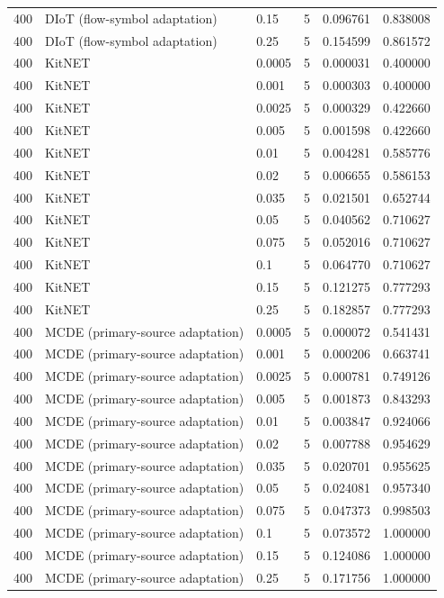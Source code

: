 \begin{tabular}{llllll}
400 & DIoT (flow-symbol adaptation) & 0.15 & 5 & 0.096761 & 0.838008 \\
400 & DIoT (flow-symbol adaptation) & 0.25 & 5 & 0.154599 & 0.861572 \\
400 & KitNET & 0.0005 & 5 & 0.000031 & 0.400000 \\
400 & KitNET & 0.001 & 5 & 0.000303 & 0.400000 \\
400 & KitNET & 0.0025 & 5 & 0.000329 & 0.422660 \\
400 & KitNET & 0.005 & 5 & 0.001598 & 0.422660 \\
400 & KitNET & 0.01 & 5 & 0.004281 & 0.585776 \\
400 & KitNET & 0.02 & 5 & 0.006655 & 0.586153 \\
400 & KitNET & 0.035 & 5 & 0.021501 & 0.652744 \\
400 & KitNET & 0.05 & 5 & 0.040562 & 0.710627 \\
400 & KitNET & 0.075 & 5 & 0.052016 & 0.710627 \\
400 & KitNET & 0.1 & 5 & 0.064770 & 0.710627 \\
400 & KitNET & 0.15 & 5 & 0.121275 & 0.777293 \\
400 & KitNET & 0.25 & 5 & 0.182857 & 0.777293 \\
400 & MCDE (primary-source adaptation) & 0.0005 & 5 & 0.000072 & 0.541431 \\
400 & MCDE (primary-source adaptation) & 0.001 & 5 & 0.000206 & 0.663741 \\
400 & MCDE (primary-source adaptation) & 0.0025 & 5 & 0.000781 & 0.749126 \\
400 & MCDE (primary-source adaptation) & 0.005 & 5 & 0.001873 & 0.843293 \\
400 & MCDE (primary-source adaptation) & 0.01 & 5 & 0.003847 & 0.924066 \\
400 & MCDE (primary-source adaptation) & 0.02 & 5 & 0.007788 & 0.954629 \\
400 & MCDE (primary-source adaptation) & 0.035 & 5 & 0.020701 & 0.955625 \\
400 & MCDE (primary-source adaptation) & 0.05 & 5 & 0.024081 & 0.957340 \\
400 & MCDE (primary-source adaptation) & 0.075 & 5 & 0.047373 & 0.998503 \\
400 & MCDE (primary-source adaptation) & 0.1 & 5 & 0.073572 & 1.000000 \\
400 & MCDE (primary-source adaptation) & 0.15 & 5 & 0.124086 & 1.000000 \\
400 & MCDE (primary-source adaptation) & 0.25 & 5 & 0.171756 & 1.000000 \\

\end{tabular}
